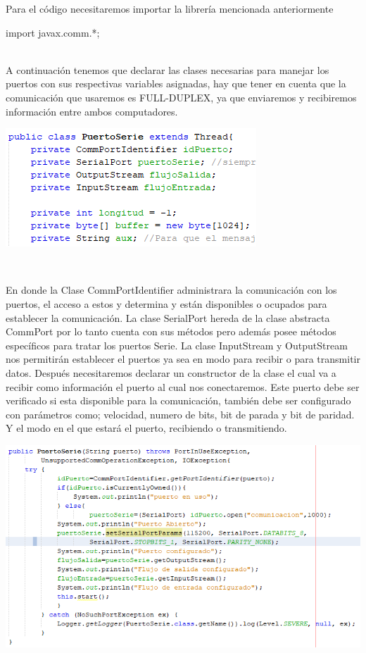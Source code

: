 \documentclass[12pt]{report}
\begin{document}
Para el código necesitaremos importar la librería mencionada anteriormente
\\
\begin{center}
    import javax.comm.*; 
\end{center}
\\
A continuación tenemos que declarar las clases necesarias para manejar los puertos con sus respectivas variables asignadas, hay que tener en cuenta que la comunicación que usaremos es FULL-DUPLEX, ya que enviaremos y recibiremos información entre ambos computadores.
\begin{center}
\includegraphics[scale=0.8]{Documento/Figuras/1.PNG}
\begin{scriptsize}
\\ 
\end{scriptsize}
\end{center}
En donde la Clase CommPortIdentifier administrara la comunicación con los puertos, el acceso a estos y determina y están disponibles o ocupados para establecer la comunicación.
La clase SerialPort hereda de la clase abstracta CommPort por lo tanto cuenta con sus métodos pero además posee métodos específicos para tratar los puertos Serie.
La clase InputStream y OutputStream nos permitirán establecer el puertos ya sea en modo para recibir o para transmitir datos.
Después necesitaremos declarar un constructor de la clase el cual va a recibir como información el puerto al cual nos conectaremos. Este puerto debe ser verificado si esta disponible para la comunicación, también debe ser configurado con parámetros como; velocidad, numero de bits, bit de parada y bit de paridad. Y el modo en el que estará el puerto, recibiendo o transmitiendo.
\begin{center}
\includegraphics[scale=0.8]{Documento/Figuras/2.PNG}
\begin{scriptsize}
\\ 
\end{scriptsize}
\end{center}
\end{document}
